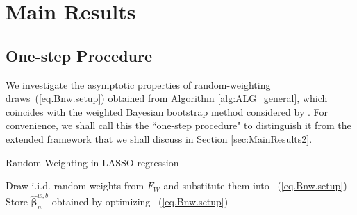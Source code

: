 \documentclass[ejs,authoryear,linksfromyear]{imsart}
\numberwithin{equation}{section}
\theoremstyle{plain}
\begin{document}
\section{Main Results} \label{sec:Main}

\subsection{One-step Procedure} \label{sec:MainResults}

We investigate the asymptotic properties of random-weighting draws~(\ref{eq.Bnw.setup}) obtained from Algorithm \ref{alg:ALG_general}, 
which coincides
with the weighted Bayesian bootstrap method 
considered by \citet{WBB}. 
For convenience, we shall call this  the ``one-step procedure" to distinguish it from the extended framework that we shall discuss in Section \ref{sec:MainResults2}. 

\begin{algorithm}
	\SetAlgoLined
	\caption{Random-Weighting in LASSO regression}
	\label{alg:ALG_general}
	 {
		Draw i.i.d. random weights from $F_W$ and substitute them into ~(\ref{eq.Bnw.setup}) \;
		Store $\widehat{\bm{\beta}}_n^{w,b}$ obtained by optimizing ~(\ref{eq.Bnw.setup}) \; 
	}   
\end{algorithm}
\end{document}
